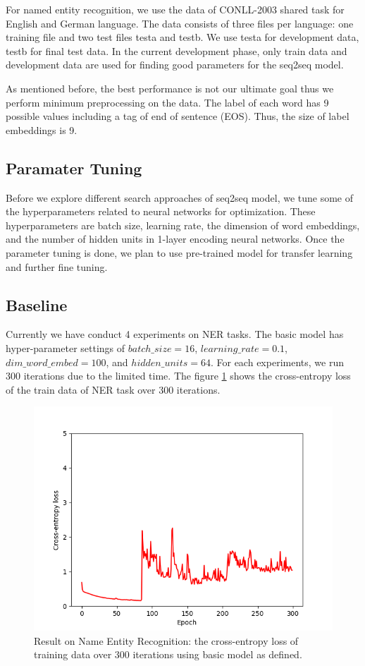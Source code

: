 \documentclass[11pt,a4paper]{article}
\begin{document}
For named entity recognition, we use the data of CONLL-2003 shared task \cite{tjongkimsang2003conll} for English and German language. The data consists of three files per language: one training file and two test files testa and testb. We use testa for development data, testb for final test data. In the current development phase, only train data and development data are used for finding good parameters for the seq2seq model. 

As mentioned before, the best performance is not our ultimate goal thus we perform minimum preprocessing on the data. The label of each word has 9 possible values including a tag of end of sentence (EOS). Thus, the size of label embeddings is 9. 


\subsection{Paramater Tuning} \label{ssec:paratune}
Before we explore different search approaches of seq2seq model, we tune some of the hyperparameters related to neural networks for optimization. These hyperparameters are batch size, learning rate, the dimension of word embeddings, and the number of hidden units in 1-layer encoding neural networks. Once the parameter tuning is done, we plan to use pre-trained model for transfer learning and further fine tuning.

\subsection{Baseline} \label{ssec:baseline}
Currently we have conduct 4 experiments on NER tasks. The basic model has hyper-parameter settings of $batch\_size=16$, $learning\_rate = 0.1$, $dim\_word\_embed =100$, and $hidden\_units=64$. For each experiments, we run 300 iterations due to the limited time. The figure \ref{fig:fig_exp1} shows the cross-entropy loss of the train data of NER task over 300 iterations. 

\begin{figure}[h]
\centering
\includegraphics[width=0.8\linewidth]{fig_exp1.png}
\caption{Result on Name Entity Recognition: the cross-entropy loss of training data over 300 iterations using basic model as defined.}
\label{fig:fig_exp1}
\end{figure}
\end{document}

